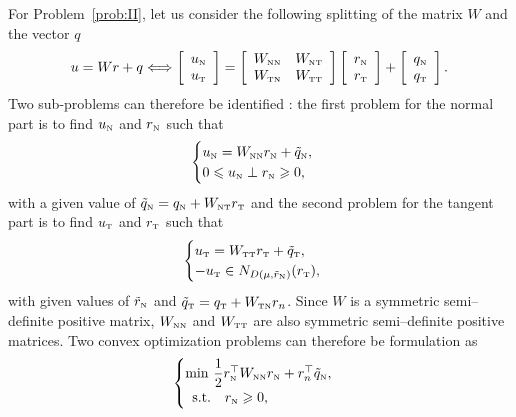For Problem~\ref{prob:II}, let us consider the following splitting of the matrix $W$ and the vector $q$
\begin{equation}
  \label{eq:W-split}
  u = W r +q \Longleftrightarrow 
  \left[\begin{array}{c}
    u_\n \\ u_\t
  \end{array}\right]
 =
  \left[\begin{array}{cc}
    W_{\n\n} &W_{\n\t} \\
    W_{\t\n} &W_{\t\t} \\    
  \end{array}\right]    \left[\begin{array}{c}
    r_\n\\ r_\t
  \end{array}\right]+
 \left[\begin{array}{c}
    q_\n \\q_\t
  \end{array}\right].
\end{equation}
Two sub-problems can therefore be identified : the first problem for the normal part is to find $u_{\hbox{\tiny{N}}}$ and $r_{\hbox{\tiny{N}}}$ such that
\begin{equation}
  \label{eq:AO-1}
  \begin{cases}
    u_\n = W_{\n\n} r_\n + \tilde q_\n, \\
    0\leq u_\n \perp r_\n \geq 0,
  \end{cases}
\end{equation}
with a given value of $\tilde q_{\hbox{\tiny{N}}} = q_{\hbox{\tiny{N}}} + W_{{\hbox{\tiny{N}}}{\hbox{\tiny{T}}}}r_{\hbox{\tiny{T}}}$ and the second problem for the tangent part is to find $u_{\hbox{\tiny{T}}}$ and $r_{\hbox{\tiny{T}}}$ such that
\begin{equation}
  \label{eq:AO-2}
  \begin{cases}
    u_\t = W_{\t\t} r_\t + \tilde q_\t, \\
   -u_\t \in N_{D(\mu,\tilde r_{\n})}(r_\t),
  \end{cases}
\end{equation}
with  given values of $\tilde r_{\hbox{\tiny{N}}}$ and $\tilde q_{\hbox{\tiny{T}}} = q_{\hbox{\tiny{T}}} + W_{{\hbox{\tiny{T}}}{\hbox{\tiny{N}}}}r_n$. Since $W$ is a symmetric semi--definite positive matrix, $W_{{\hbox{\tiny{N}}}{\hbox{\tiny{N}}}}$ and $W_{{\hbox{\tiny{T}}}{\hbox{\tiny{T}}}}$ are also symmetric semi--definite positive matrices. Two convex optimization problems can therefore be formulation as
 \begin{equation}
  \label{eq:AO-3}
  \begin{cases}
    \min\, \Frac 1 2 r_\n^\top  W_{\n\n} r_\n + r_n^\top \tilde q_\n, \\
    \begin{array}{ll}
    \text{s.t.} & r_\n \geq 0,
  \end{array}\end{cases}
\end{equation}
